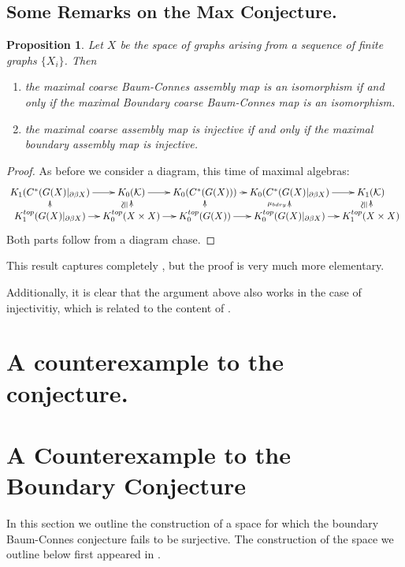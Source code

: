 \documentclass[11pt]{amsart}
\theoremstyle{plain}
\newtheorem{proposition}[theorem]{Proposition}%
\theoremstyle{definition}%
\theoremstyle{remark}%
\newcommand{\ucong}{\rotatebox{90}{$\cong$}}
\begin{document}
\subsection{Some Remarks on the Max Conjecture.}
\begin{proposition}\label{Prop:Max}
Let $X$ be the space of graphs arising from a sequence of finite graphs $\lbrace X_{i} \rbrace$. Then
\begin{enumerate}
\item the maximal coarse Baum-Connes assembly map is an isomorphism if and only if the maximal Boundary coarse Baum-Connes map is an isomorphism.
\item the maximal coarse assembly map is injective if and only if the maximal boundary assembly map is injective.
\end{enumerate}
\end{proposition}
\begin{proof}
As before we consider a diagram, this time of maximal algebras:
\begin{equation*}
\xymatrix@=0.7em{
K_{1}(C^{*}(G(X)|_{\partial\beta X}) \ar[r] & K_{0}(\mathcal{K}) \ar[r]& K_{0}(C^{*}(G(X))) \ar[r]& K_{0}(C^{*}(G(X)|_{\partial\beta X})\ar[r] & K_{1}(\mathcal{K})  \\
K_{1}^{top}(G(X)|_{\partial\beta X}) \ar[r] \ar[u]& K_{0}^{top}(X \times X) \ar[r]\ar[u]^{\ucong}& K_{0}^{top}(G(X)) \ar[r]\ar[u]& K_{0}^{top}(G(X)|_{\partial\beta X}) \ar[r]\ar[u]^{\mu_{bdry}}& K_{1}^{top}(X \times X)\ar[u]^{\ucong}
}
\end{equation*}
Both parts follow from a diagram chase.
\end{proof}


This result captures completely \cite[Corollary 4.18]{MR2568691}, but the proof is very much more elementary.

Additionally, it is clear that the argument above also works in the case of injectivitiy, which is related to the content of \cite[Theorem 5.1]{MR2431253}.

\section{A counterexample to the conjecture.}

\section{A Counterexample to the Boundary Conjecture}

In this section we outline the construction of a space for which the boundary Baum-Connes conjecture fails to be surjective. The construction of the space we outline below first appeared in \cite{MR2363697}.
\end{document}
